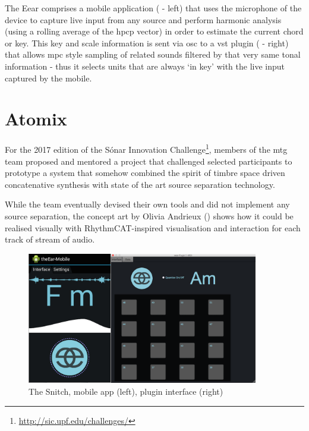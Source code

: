 The Eear comprises a mobile application ( - left) that uses the microphone of the device to capture live input from any source and perform harmonic analysis (using a rolling average of the \acrshort{hpcp} vector) in order to estimate the current chord or key. This key and scale information is sent via \acrshort{osc} to a \acrshort{vst} plugin ( - right) that allows \acrshort{mpc} style sampling of related sounds filtered by that very same tonal information - thus it selects units that are always `in key' with the live input captured by the mobile.

\section{Atomix}

For the 2017 edition of the Sónar Innovation Challenge\footnote{\url{http://sic.upf.edu/challenges/}}, members of the \acrshort{mtg} team proposed and mentored a project that challenged selected participants to prototype a system that somehow combined the spirit of timbre space driven concatenative synthesis with state of the art source separation technology.

While the team eventually devised their own tools and did not implement any source separation, the concept art by Olivia Andrieux () shows how it could be realised visually with RhythmCAT-inspired visualisation and interaction for each track of stream of audio.

\begin{figure}
	\begin{center}
		\includegraphics[width=0.9\textwidth]{ch99/figures/combined.png}
	\end{center}
	\caption[The Snitch Enhanced DJ Assistant Mobile and Plugin Interface]{The Snitch, mobile app (left), plugin interface (right)}
	\label{fig:eear}
\end{figure}

